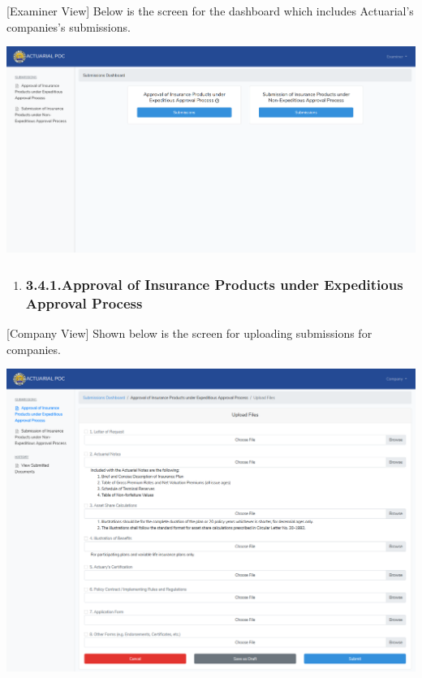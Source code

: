 \documentclass{article}
\begin{document}
[Examiner View] Below is the screen for the dashboard
which includes Actuarial’s companies’s submissions.%

\includegraphics[keepaspectratio=true]{up-ic-screens/image73}{}%

\begin{enumerate}[noitemsep,topsep=\mdcompacttopsep]%

\item{}
\subsubsection{3.4.1.\hspace*{0.5em}Approval of Insurance Products under Expeditious Approval Process}\label{sec-approval-of-insurance-products-under-expeditious-approval-process}%
\end{enumerate}%

\noindent{}[Company View] Shown below is the screen for
uploading submissions for companies.%

\includegraphics[keepaspectratio=true]{up-ic-screens/image168}{}%
\end{document}
